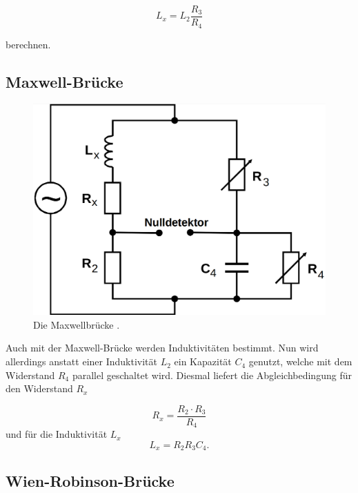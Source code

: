 \begin{equation}
    L_x = L_2 \frac{R_3}{R_4}
\end{equation}

berechnen.

\subsection{Maxwell-Brücke}

\begin{figure}
    \centering
    \includegraphics[scale=0.25]{content/Maxwellbruecke.png}
    \caption{Die Maxwellbrücke \cite[S. 222]{anleitung}.}
    \label{fig:maxwell}
\end{figure}

Auch mit der Maxwell-Brücke werden Induktivitäten bestimmt. 
Nun wird allerdings anstatt einer Induktivität $L_2$ ein Kapazität $C_4$ genutzt,
welche mit dem Widerstand $R_4$ parallel geschaltet wird. 
Diesmal liefert die Abgleichbedingung für den Widerstand $R_x$

\begin{equation}
    R_x = \frac{R_2 \cdot R_3}{R_4}
\end{equation}
und für die Induktivität $L_x$
\begin{equation}
    L_x = R_2 R_3 C_4 .
\end{equation}

\subsection{Wien-Robinson-Brücke}

